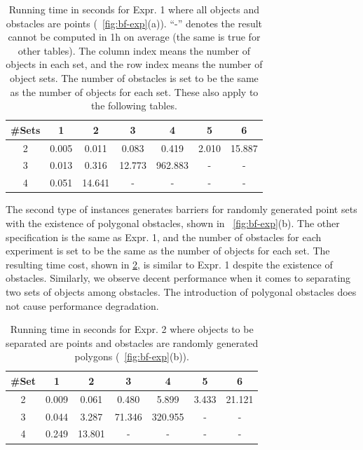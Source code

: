 \begin{table}[ht]
    \centering
    \begin{tabular}{|c|c|c|c|c|c|c|}\hline
        \#Sets &  1 & 2 & 3 & 4& 5& 6\\\hline
 2& 0.005 & 0.011 & 0.083 & 0.419 & 2.010 & 15.887 \\\hline
 3& 0.013 & 0.316 & 12.773 & 962.883 & - & - \\\hline
 4& 0.051 & 14.641 &  -& - &  -&- \\\hline
\end{tabular}
    \caption{Running time in seconds for Expr. 1 where all objects and obstacles are points (~\ref{fig:bf-exp}(a)). ``-'' denotes the result cannot be computed in 1h on average (the same is true for other tables). 
    The column index means the number of objects in each set, and the row index means the number of object sets.
    The number of obstacles is set to be the same as the number of objects for each set. These also apply to the following tables.
    }
    \label{tab:bf-expr_1}
\end{table}

 The second type of instances generates barriers for randomly generated 
 point sets with the existence of polygonal obstacles, shown in ~\ref{fig:bf-exp}(b). 
 The other specification is the same as Expr. 1, and the number of obstacles for each experiment is set to be the same as the number of objects for each set. 
 The resulting time cost, shown in \ref{tab:bf-expr_2}, is similar to Expr. 1 despite the existence of obstacles.
 Similarly, we observe decent performance when it comes to separating two sets of objects among obstacles. 
 The introduction of polygonal obstacles does not cause performance degradation. 


\begin{table}[ht]
    \centering
    \begin{tabular}{|c|c|c|c|c|c|c|}\hline
        \#Set &  1 & 2 & 3 & 4& 5& 6\\\hline
2& 0.009 & 0.061 & 0.480 & 5.899 & 3.433 & 21.121\\\hline
 3& 0.044 & 3.287 & 71.346 & 320.955 & - & -\\\hline
 4& 0.249 & 13.801 & - & - & - & -\\\hline
    \end{tabular}
    \caption{Running time in seconds for Expr. 2 where objects to be separated are points and obstacles are randomly generated polygons (~\ref{fig:bf-exp}(b)). 
    }
    \label{tab:bf-expr_2}
    \vspace{-2mm}
\end{table}
 
